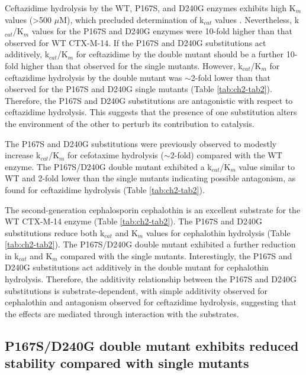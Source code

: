 \documentclass[../main.tex]{subfiles}
\begin{document}
        Ceftazidime hydrolysis by the WT, P167S, and D240G enzymes exhibits high K$_{m}$ values (>500 $\mu$M), which precluded determination of k$_{cat}$ values \cite{patel_characterization_2015}. Nevertheless, k$_{cat}$/K$_{m}$ values for the P167S and D240G enzymes were 10-fold higher than that observed for WT CTX-M-14. If the P167S and D240G substitutions act additively, k$_{cat}$/K$_{m}$ for ceftazidime by the double mutant should be a further 10-fold higher than that observed for the single mutants\cite{wells_additivity_1990}. However, k$_{cat}$/K$_{m}$ for ceftazidime hydrolysis by the double mutant was $\sim$2-fold lower than that observed for the P167S and D240G single mutants (Table \ref{tab:ch2-tab2}). Therefore, the P167S and D240G substitutions are antagonistic with respect to ceftazidime hydrolysis. This suggests that the presence of one substitution alters the environment of the other to perturb its contribution to catalysis\cite{wells_additivity_1990}.

        The P167S and D240G substitutions were previously observed to modestly increase k$_{cat}$/K$_{m}$ for cefotaxime hydrolysis ($\sim$2-fold) compared with the WT enzyme\cite{patel_characterization_2015}. The P167S/D240G double mutant exhibited a k$_{cat}$/K$_{m}$ value similar to WT and 2-fold lower than the single mutants indicating possible antagonism, as found for ceftazidime hydrolysis (Table \ref{tab:ch2-tab2}).

        The second-generation cephalosporin cephalothin is an excellent substrate for the WT CTX-M-14 enzyme (Table \ref{tab:ch2-tab2})\cite{patel_characterization_2015}. The P167S and D240G substitutions reduce both k$_{cat}$ and K$_{m}$ values for cephalothin hydrolysis (Table \ref{tab:ch2-tab2}). The P167S/D240G double mutant exhibited a further reduction in k$_{cat}$ and K$_{m}$ compared with the single mutants. Interestingly, the P167S and D240G substitutions act additively in the double mutant for cephalothin hydrolysis. Therefore, the additivity relationship between the P167S and D240G substitutions is substrate-dependent, with simple additivity observed for cephalothin and antagonism observed for ceftazidime hydrolysis, suggesting that the effects are mediated through interaction with the substrates.

    \subsection{P167S/D240G double mutant exhibits reduced stability compared with single mutants}
\end{document}
